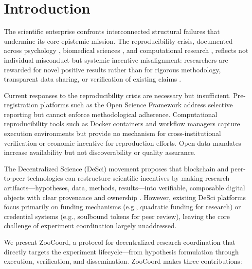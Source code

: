 \section{Introduction}

\label{sec:introduction}

The scientific enterprise confronts interconnected structural failures that undermine its core epistemic mission.
The reproducibility crisis, documented across psychology \citep{openscience2015estimating}, biomedical sciences \citep{begley2012drug}, and computational research \citep{hutson2018artificial}, reflects not individual misconduct but systemic incentive misalignment: researchers are rewarded for novel positive results rather than for rigorous methodology, transparent data sharing, or verification of existing claims \citep{smaldino2016natural}.

Current responses to the reproducibility crisis are necessary but insufficient.
Pre-registration platforms such as the Open Science Framework \citep{nosek2018preregistration} address selective reporting but cannot enforce methodological adherence.
Computational reproducibility tools such as Docker containers and workflow managers \citep{gruning2018practical} capture execution environments but provide no mechanism for cross-institutional verification or economic incentive for reproduction efforts.
Open data mandates \citep{wilkinson2016fair} increase availability but not discoverability or quality assurance.

The Decentralized Science (DeSci) movement proposes that blockchain and peer-to-peer technologies can restructure scientific incentives by making research artifacts---hypotheses, data, methods, results---into verifiable, composable digital objects with clear provenance and ownership \citep{hamburg2019desci}.
However, existing DeSci platforms focus primarily on funding mechanisms (e.g., quadratic funding for research) or credential systems (e.g., soulbound tokens for peer review), leaving the core challenge of experiment coordination largely unaddressed.

We present ZooCoord, a protocol for decentralized research coordination that directly targets the experiment lifecycle---from hypothesis formulation through execution, verification, and dissemination.
ZooCoord makes three contributions:

